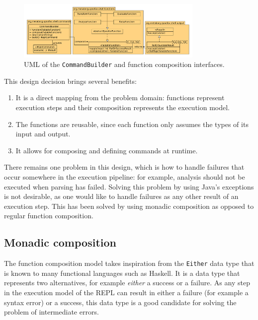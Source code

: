 \begin{figure}[b]
  \centering
  \includegraphics[width=0.8\textwidth]{uml-function-comp}
  \caption{UML of the \texttt{CommandBuilder} and function composition
    interfaces.}
  \label{fig:uml-function-comp}
\end{figure}

This design decision brings several benefits:

\begin{enumerate}
\item It is a direct mapping from the problem domain: functions
  represent execution steps and their composition represents the
  execution model.
\item The functions are reusable, since each function only assumes
  the types of its input and output.
\item It allows for composing and defining commands at runtime.
\end{enumerate}

There remains one problem in this design, which is how to handle
failures that occur somewhere in the execution pipeline: for example,
analysis should not be executed when parsing has failed. Solving this
problem by using Java's exceptions is not desirable, as one would like
to handle failures as any other result of an execution step. This
has been solved by using monadic composition as opposed to regular function
composition.

\subsection{Monadic composition}
\label{sec:monadic-composition}
The function composition model takes inspiration from the \texttt{Either}
data type that is known to many functional languages such as
Haskell. It is a data type that represents two alternatives, for
example \textit{either} a success or a failure. As any step in the
execution model of the REPL can result in either a failure (for
example a syntax error) or a success, this data type is a good
candidate for solving the problem of intermediate errors.

